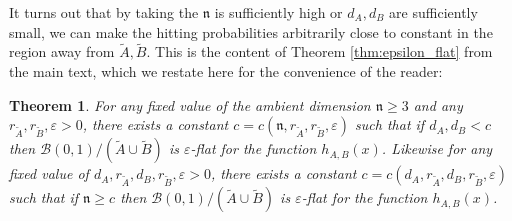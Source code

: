 \documentclass[english, aip, jcp, priprint, graphicx,floatfix]{revtex4-1}
\newtheorem{theorem}{Theorem}
\theoremstyle{plain}
\theoremstyle{definition}
\theoremstyle{plain}
\newcommand{\dimension}{{\mathfrak{n}}}
\newcommand{\bb}[1]{\mathcal{B}\left(#1\right)}
\begin{document}
It turns out that by taking the $\dimension$ is sufficiently high or $d_A,d_B$ are sufficiently small, we can make the hitting probabilities arbitrarily close to constant in the region away from $\tilde A,\tilde B$.  This is the content of Theorem \ref{thm:epsilon_flat} from the main text, which we restate here for the convenience of the reader:

\begingroup
\def\thetheorem{\ref{thm:epsilon_flat}}
\begin{theorem}  For any fixed value of the ambient dimension $\dimension \geq 3$ and any $r_{\tilde{A}}, r_{\tilde{B}}, \varepsilon > 0$, there exists a constant $c=c(\dimension, r_{\tilde{A}}, r_{\tilde{B}}, \varepsilon)$ such that if $d_{A}, d_{B} < c$ then $\bb {0, 1} / (\tilde{A} \cup \tilde{B})$ is $\varepsilon$-flat for the function $h_{A,B}(x)$.  Likewise for any fixed value of $d_{A}, r_{\tilde{A}}, d_{B}, r_{\tilde{B}}, \varepsilon>0$, there exists a constant $c=c(d_{A}, r_{\tilde{A}}, d_{B}, r_{\tilde{B}}, \varepsilon)$ such that if $\dimension \geq c$ then $\bb {0, 1} / (\tilde{A} \cup \tilde{B})$ is $\varepsilon$-flat for the function $h_{A,B}(x)$.
\end{theorem}
\addtocounter{theorem}{-1}
\endgroup
\end{document}
